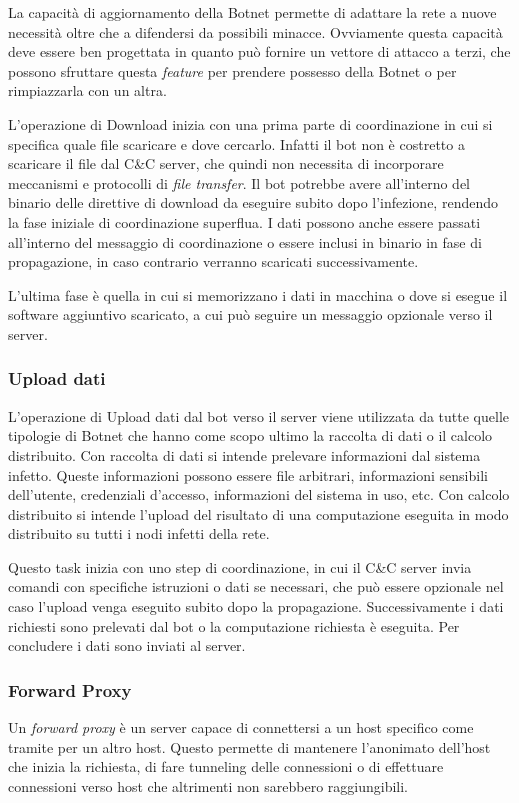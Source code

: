 La capacità di aggiornamento della Botnet permette di adattare la rete a nuove necessità oltre che a difendersi da possibili minacce. Ovviamente questa capacità deve essere ben progettata in quanto può fornire un vettore di attacco a terzi, che possono sfruttare questa \textit{feature} per prendere possesso della Botnet o per rimpiazzarla con un altra.

L'operazione di Download inizia con una prima parte di coordinazione in cui si specifica quale file scaricare e dove cercarlo. Infatti il bot non è costretto a scaricare il file dal C\&C server, che quindi non necessita di incorporare meccanismi e protocolli di \textit{file transfer}. Il bot potrebbe avere all'interno del binario delle direttive di download da eseguire subito dopo l'infezione, rendendo la fase iniziale di coordinazione  superflua.
I dati possono anche essere passati all'interno del messaggio di coordinazione o essere inclusi in binario in fase di propagazione, in caso contrario verranno scaricati successivamente.

L'ultima fase è quella in cui si memorizzano i dati in macchina o dove si esegue il software aggiuntivo scaricato, a cui può seguire un messaggio opzionale verso il server.

\subsubsection{Upload dati}
L'operazione di Upload dati dal bot verso il server viene utilizzata da tutte quelle tipologie di Botnet che hanno come scopo ultimo la raccolta di dati o il calcolo distribuito.
Con raccolta di dati si intende prelevare informazioni dal sistema infetto. Queste informazioni possono essere file arbitrari, informazioni sensibili dell'utente, credenziali d'accesso, informazioni del sistema in uso, etc.
Con calcolo distribuito si intende l'upload del risultato di una computazione eseguita in modo distribuito su tutti i nodi infetti della rete.

Questo task inizia con uno step di coordinazione, in cui il C\&C server invia comandi con specifiche istruzioni o dati se necessari, che può essere opzionale nel caso l'upload venga eseguito subito dopo la propagazione. 
Successivamente i dati richiesti sono prelevati dal bot o la computazione richiesta è eseguita. 
Per concludere i dati sono inviati al server.
\subsubsection{Forward Proxy}
Un \textit{forward proxy} è un server capace di connettersi a un  host specifico come tramite per un altro host.
Questo permette di mantenere l'anonimato dell'host che inizia la richiesta, di fare tunneling  delle connessioni o di effettuare connessioni verso host che altrimenti non sarebbero raggiungibili.

